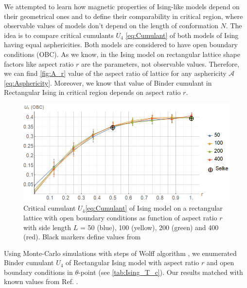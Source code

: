 \documentclass[aps,pre,amssymb,amsmath,twocolumn,floatfix]{revtex4-2}
\begin{document}

We attempted to learn how magnetic properties of Ising-like models depend on their geometrical ones and to define their comparability in critical region, where observable values of models don't depend on the length of conformation $N$. The idea is to compare critical cumulants $U_{4}$ \eqref{eq:Cumulant} of both models of Ising having equal asphericities. Both models are considered to have open boundary conditions (OBC). As we know, in the Ising model on rectangular lattice shape factors like aspect ratio $r$ are the parameters, not observable values. Therefore, we can find \eqref{fig:A_r} value of the aspect ratio of lattice for any asphericity $\mathcal{A}$ \eqref{eq:Asphericity}. Moreover, we know that value of Binder cumulant in Rectangular Ising\cite{Selke2006} in critical region depends on aspect ratio $r$. 

\begin{figure}[h]
    \centering
    \includegraphics[width=\columnwidth]{Images/CumulantOBC.png}
    \caption{Critical cumulant $U_{4}$\eqref{eq:Cumulant} of Ising model on a rectangular lattice with open boundary conditions as function of aspect ratio $r$ with side length $L$ = 50 (blue), 100 (yellow), 200 (green) and 400 (red). Black markers define values from \cite{Selke2006}}
    \label{fig:A_r}
\end{figure}

Using Monte-Carlo simulations with steps of Wolff algorithm \cite{newmanb99}, we enumerated Binder cumulant $U_{4}$ of Rectangular Ising model with aspect ratio $r$ and open boundary conditions in $\theta$-point (see \cref{tab:Ising_T_c}). Our results matched with known values from Ref. \cite{Selke2006}.
\end{document}

